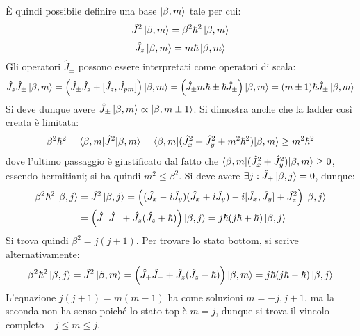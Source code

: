 È quindi possibile definire una base $ \ket{\beta,m} $ tale per cui:
\begin{equation}
	\hat{J}^2 \ket{\beta,m} = \beta^2 \hbar^2 \ket{\beta,m}
	\label{eq:9.19}
\end{equation}
\begin{equation}
	\hat{J}_z \ket{\beta,m} = m \hbar \ket{\beta,m}
	\label{eq:9.20}
\end{equation}
Gli operatori $ \hat{J}_{\pm} $ possono essere interpretati come operatori di scala:
\begin{equation*}
	\hat{J}_z \hat{J}_{\pm} \ket{\beta,m} = \left( \hat{J}_{\pm} \hat{J}_z + [\hat{J}_z, \hat{J}_{pm}] \right) \ket{\beta,m} = \left( \hat{J}_{\pm} m\hbar \pm \hbar \hat{J}_{\pm} \right) \ket{\beta,m} = (m \pm 1) \hbar \hat{J}_{\pm} \ket{\beta,m}
\end{equation*}
Si deve dunque avere $ \hat{J}_{\pm} \ket{\beta,m} \propto \ket{\beta,m \pm 1} $. Si dimostra anche che la ladder così creata è limitata:
\begin{equation*}
	\beta^2 \hbar^2 = \braket{\beta,m | \hat{J}^2 | \beta,m} = \braket{\beta,m | ( \hat{J}_x^2 + \hat{J}_y^2 + m^2 \hbar^2 ) | \beta,m} \ge m^2 \hbar^2
\end{equation*}
dove l'ultimo passaggio è giustificato dal fatto che $ \braket{\beta,m | (\hat{J}_x^2 + \hat{J}_y^2) | \beta,m} \ge 0 $, essendo hermitiani; si ha quindi $ m^2 \le \beta^2 $. Si deve avere $ \exists j : \hat{J}_+ \ket{\beta,j} = 0 $, dunque:
\begin{equation*}
	\begin{split}
		\beta^2 \hbar^2 \ket{\beta,j}
		&= \hat{J}^2 \ket{\beta,j} = \left( (\hat{J}_x - i \hat{J}_y) (\hat{J}_x + i \hat{J}_y) - i [\hat{J}_x,\hat{J}_y] + \hat{J}_z^2 \right) \ket{\beta,j} \\
		&= \left( \hat{J}_- \hat{J}_+ + \hat{J}_z (\hat{J}_z + \hbar) \right) \ket{\beta,j} = j\hbar (j\hbar + \hbar) \ket{\beta,j}
	\end{split}
\end{equation*}
Si trova quindi $ \beta^2 = j (j + 1) $. Per trovare lo stato bottom, si scrive alternativamente:
\begin{equation*}
	\beta^2 \hbar^2 \ket{\beta,j} = \hat{J}^2 \ket{\beta,m} = \left( \hat{J}_+ \hat{J}_- + \hat{J}_z (\hat{J}_z - \hbar) \right) \ket{\beta,m} = j\hbar (j\hbar - \hbar) \ket{\beta,j}
\end{equation*}
L'equazione $ j(j + 1) = m(m - 1) $ ha come soluzioni $ m = -j, j+1 $, ma la seconda non ha senso poiché lo stato top è $ m = j $, dunque si trova il vincolo completo $ -j \le m \le j $.\\
